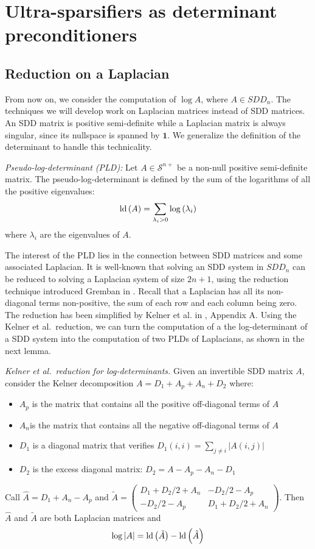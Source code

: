 
\section{Ultra-sparsifiers as determinant preconditioners}


\subsection{Reduction on a Laplacian}

\label{sec:Making-the-problem}

From now on, we consider the computation of $\log A$, where $A\in SDD_{n}$.
The techniques we will develop work on Laplacian matrices instead
of SDD matrices. An SDD matrix is positive semi-definite while a Laplacian
matrix is always singular, since its nullspace is spanned by $\mathbf{1}$.
We generalize the definition of the determinant to handle this technicality. 
\begin{definition}
\emph{Pseudo-log-determinant (PLD):} Let $A\in\mathcal{S}^{n+}$ be
a non-null positive semi-definite matrix. The pseudo-log-determinant
is defined by the sum of the logarithms of all the positive eigenvalues:
\[
\text{\textnormal{ld}}\left(A\right)=\sum_{\lambda_{i}>0}\log\left(\lambda_{i}\right)
\]
where $\lambda_{i}$ are the eigenvalues of $A$. 
\end{definition}
The interest of the PLD lies in the connection between SDD matrices
and some associated Laplacian. It is well-known that solving an SDD
system in $SDD_{n}$ can be reduced to solving a Laplacian system
of size $2n+1$, using the reduction technique introduced Gremban
in \cite{Gremban1996}. Recall that a Laplacian has all its non-diagonal
terms non-positive, the sum of each row and each column being zero.
The reduction has been simplified by Kelner et al. in \cite{kelner2013simple},
Appendix A. Using the Kelner et al.\ reduction, we can turn the computation
of a the log-determinant of a SDD system into the computation of two
PLDs of Laplacians, as shown in the next lemma. 
\begin{lemma}
\emph{Kelner et al.\ reduction for log-determinants. }Given an invertible
SDD matrix $A$, consider the Kelner decomposition $A=D_{1}+A_{p}+A_{n}+D_{2}$
where: 
\begin{itemize}
\item $A_{p}$ is the matrix that contains all the positive off-diagonal
terms of $A$ 
\item $A_{n}$is the matrix that contains all the negative off-diagonal
terms of $A$ 
\item $D_{1}$ is a diagonal matrix that verifies $D_{1}\left(i,i\right)=\sum_{j\neq i}\left|A\left(i,j\right)\right|$ 
\item $D_{2}$ is the excess diagonal matrix: $D_{2}=A-A_{p}-A_{n}-D_{1}$ 
\end{itemize}
Call $\hat{A}=D_{1}+A_{n}-A_{p}$ and $\tilde{A}=\left(\begin{array}{cc}
D_{1}+D_{2}/2+A_{n} & -D_{2}/2-A_{p}\\
-D_{2}/2-A_{p} & D_{1}+D_{2}/2+A_{n}
\end{array}\right)$. Then $\hat{A}$ and $\tilde{A}$ are both Laplacian matrices and
\[
\log\left|A\right|=\text{\textnormal{ld}}\left(\tilde{A}\right)-\text{\textnormal{ld}}\left(\hat{A}\right)
\]
\end{lemma}
